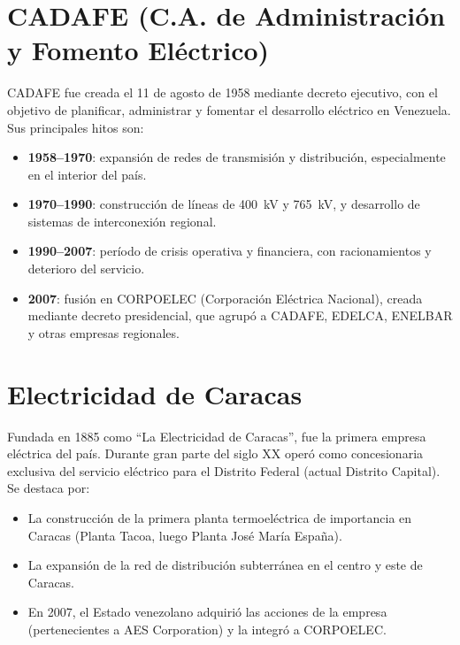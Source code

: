 \documentclass[12pt,a4paper]{article}
\begin{document}
\section{CADAFE (C.A. de Administración y Fomento Eléctrico)}

CADAFE fue creada el 11 de agosto de 1958 mediante decreto ejecutivo,
con el objetivo de planificar, administrar y fomentar el desarrollo
eléctrico en Venezuela. Sus principales hitos son:

\begin{itemize}[nosep]
    \item \textbf{1958--1970}: expansión de redes de transmisión y
          distribución, especialmente en el interior del país.
    \item \textbf{1970--1990}: construcción de líneas de \SI{400}{\kilo\volt}
          y \SI{765}{\kilo\volt}, y desarrollo de sistemas de
          interconexión regional.
    \item \textbf{1990--2007}: período de crisis operativa y financiera,
          con racionamientos y deterioro del servicio.
    \item \textbf{2007}: fusión en CORPOELEC (Corporación Eléctrica
          Nacional), creada mediante decreto presidencial, que agrupó a
          CADAFE, EDELCA, ENELBAR y otras empresas regionales.
\end{itemize}

\section{Electricidad de Caracas}

Fundada en 1885 como ``La Electricidad de Caracas'', fue la primera
empresa eléctrica del país. Durante gran parte del siglo XX operó como
concesionaria exclusiva del servicio eléctrico para el Distrito Federal
(actual Distrito Capital). Se destaca por:

\begin{itemize}[nosep]
    \item La construcción de la primera planta termoeléctrica de
          importancia en Caracas (Planta Tacoa, luego Planta José María
          España).
    \item La expansión de la red de distribución subterránea en el
          centro y este de Caracas.
    \item En 2007, el Estado venezolano adquirió las acciones de la
          empresa (pertenecientes a AES Corporation) y la integró a
          CORPOELEC.
\end{itemize}
\end{document}
